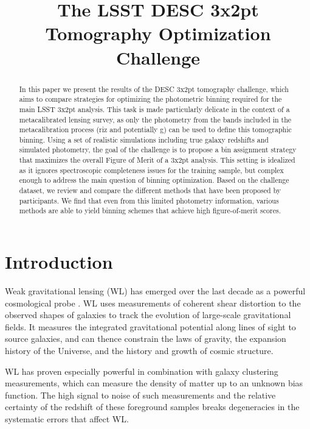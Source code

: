 \documentclass[twocolumn,twocolappendix]{aastex63}
\begin{document}
\title{The LSST DESC 3x2pt Tomography Optimization Challenge}


\begin{abstract}
In this paper we present the results of the DESC 3x2pt tomography challenge,
which aims to compare strategies for optimizing the photometric binning required
for the main LSST 3x2pt analysis. This task is made particularly delicate in the
context of a metacalibrated lensing survey, as only the photometry from the
bands  included in the metacalibration process (riz and potentially g) can be
used to define this tomographic binning. Using a set of realistic simulations
including true galaxy redshifts and simulated photometry, the goal of the
challenge is to propose a bin assignment strategy that maximizes the overall
Figure of Merit of a 3x2pt analysis. This setting is idealized as it ignores
spectroscopic completeness  issues for the training sample, but complex enough
to address the main question of binning optimization. Based on the challenge
dataset, we review and compare the different methods that have been proposed by
participants. We find that even from this limited photometry information,
various methods are able to yield binning schemes that achieve high figure-of-merit scores.
\end{abstract}





\section{Introduction}
Weak gravitational lensing (WL) has emerged over the last decade as a powerful
cosmological probe \citep{cfhtlens,des,kids,hsc}.  WL
uses measurements of coherent shear distortion to the observed shapes of galaxies
to track the evolution of large-scale gravitational fields.  It measures the integrated
gravitational potential along lines of sight to source galaxies, and can thence constrain
the laws of gravity, the expansion history of the Universe, and the history and growth
of cosmic structure.

WL has proven especially powerful in combination with galaxy clustering measurements,
which can measure the density of matter up to an unknown bias function.  The high signal
to noise of such measurements and the relative certainty of the redshift of these foreground
samples breaks degeneracies in the systematic errors that affect WL.
\end{document}
